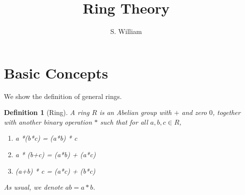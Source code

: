 \documentclass[11pt,a4paper,fleqn]{article}
\begin{document}
\renewcommand{\S}{\mathscr{S}}                       %
\renewcommand{\d}{\mathrm{d}}                          %
\renewcommand{\i}{\mathrm{i}}                          %
\newcommand{\ei}[1]{\mathrm{e}^{\mathrm{i}#1}}              %
\newcommand{\id}{\mathrm{id}}                    %
\newcommand{\gen}[1]{\langle#1\rangle}                                    %
\newcommand{\fix}{\mathrm{fix}}                               %
\newcommand{\map}{\rightarrow}                               %
\newcommand{\Rxt}{{\textbf{Rxt}}}                              %
\newcommand{\Fld}{{\textbf{Fld}}}                              %
\newcommand{\Dom}{{\textbf{Dom}}}                              %
\newcommand{\Prm}{{\mathrm{P}}}

\newenvironment{proof}{\emph{Proof.}\hspace{0.5cm}}{$\hspace{0.4cm}\Box$\\}
\newtheorem{theorem}{Theorem}[section]
\newtheorem{lemma}{Lemma}[section]
\newtheorem{remark}{Remark}[section]
\newtheorem{corollary}{Corollary}[section]
\newtheorem{fact}{Fact}[section]
\newtheorem{proposition}{Proposition}[section]
\newtheorem{example}{Example}[section]
\newtheorem{definition}{Definition}[section]



\title{Ring Theory}
\date{}
\author{S. William}
\maketitle

\section{Basic Concepts}
We show the definition of general rings.
\begin{definition}[Ring]\label{df:ring}
A ring $R$ is an Abelian group with $+$ and zero $0$, together with another binary operation $*$ such that for all $a, b,c \in R$,
\begin{enumerate}[1)]
  \item
  a *(b*c) = (a*b) * c
  \item
  a * (b+c) = (a*b) + (a*c)
  \item
  (a+b) * c = (a*c) + (b*c)
\end{enumerate}
As usual, we denote $ab=a*b$.
\end{definition}
\end{document}

